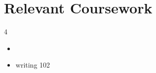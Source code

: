 \documentclass[letterpaper,11pt]{article}
\begin{document}
\section{Relevant Coursework}
	\vspace{-13pt}	%
	\small{
        	\begin{multicols}{4}
            	\begin{itemize}[itemsep=-5pt, parsep=3pt]
		\item {}
		\item writing 102
            	\end{itemize}
        	\end{multicols}
	}
\end{document}
